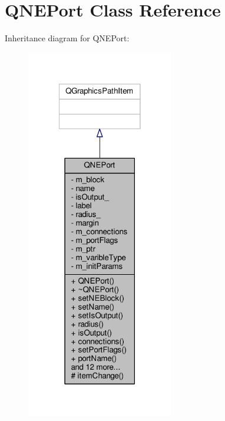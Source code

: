 \hypertarget{class_q_n_e_port}{\section{Q\-N\-E\-Port Class Reference}
\label{class_q_n_e_port}
}


Inheritance diagram for Q\-N\-E\-Port\-:
\nopagebreak
\begin{figure}[H]
\begin{center}
\leavevmode
\includegraphics[width=182pt]{class_q_n_e_port__inherit__graph}
\end{center}
\end{figure}


